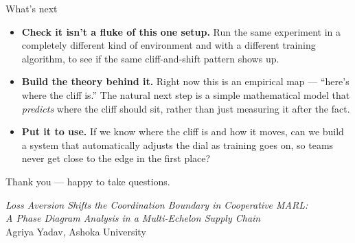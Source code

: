 \documentclass[aspectratio=169]{beamer}
\begin{document}
\begin{frame}{What's next}
  \begin{itemize}
    \item \textbf{Check it isn't a fluke of this one setup.} Run the same experiment in a completely different kind of environment and with a different training algorithm, to see if the same cliff-and-shift pattern shows up.
    \item \textbf{Build the theory behind it.} Right now this is an empirical map --- ``here's where the cliff is.'' The natural next step is a simple mathematical model that \emph{predicts} where the cliff should sit, rather than just measuring it after the fact.
    \item \textbf{Put it to use.} If we know where the cliff is and how it moves, can we build a system that automatically adjusts the dial as training goes on, so teams never get close to the edge in the first place?
  \end{itemize}
\end{frame}

\begin{frame}
  \begin{center}
    \Large Thank you --- happy to take questions.

    \vspace{0.5cm}
    \normalsize
    \emph{Loss Aversion Shifts the Coordination Boundary in Cooperative MARL: \\ A Phase Diagram Analysis in a Multi-Echelon Supply Chain} \\
    Agriya Yadav, Ashoka University
  \end{center}
\end{frame}
\end{document}
